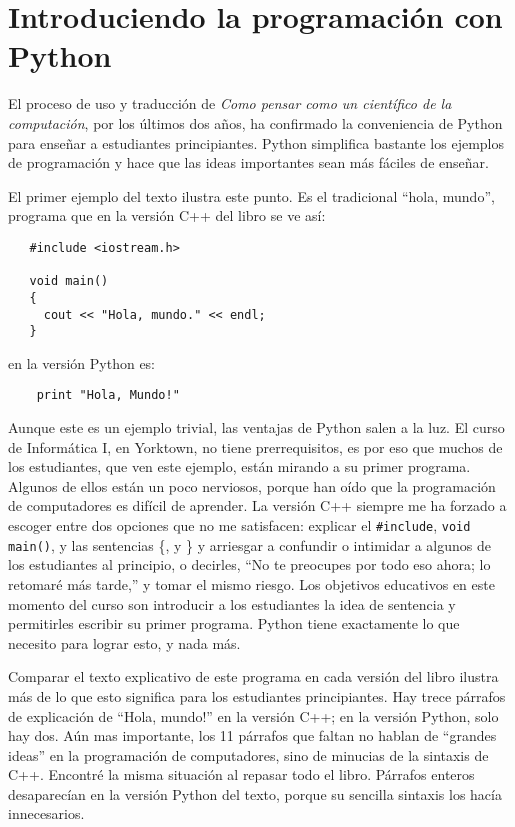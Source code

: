\section*{Introduciendo la programación con Python}

El proceso de uso y traducción de {\em Como pensar como un científico de la computación}, por los 
últimos dos años, ha confirmado la conveniencia de Python para enseñar
a estudiantes principiantes.  Python simplifica bastante los ejemplos de
programación y hace que las ideas importantes sean más fáciles de enseñar.

El primer ejemplo del texto ilustra este punto. Es el tradicional ``hola, mundo'', programa 
que en la versión C++ del libro se ve así:

\begin{verbatim}
   #include <iostream.h>

   void main()
   {
     cout << "Hola, mundo." << endl;
   }
\end{verbatim}

en la versión Python es:

\begin{verbatim}
    print "Hola, Mundo!"
\end{verbatim}

Aunque este es un ejemplo trivial, las ventajas de Python salen a la luz.  
El curso de Informática I, en Yorktown, no tiene prerrequisitos, es por eso que muchos de
los estudiantes, que ven este ejemplo, están mirando a su primer programa.  Algunos de 
ellos están un poco nerviosos, porque han oído que la programación de computadores es
difícil de aprender.  La versión C++ siempre me ha forzado a escoger entre dos
opciones que no me satisfacen:  explicar el \texttt{\#include}, \texttt{void main()}, y las
sentencias \{, y \} y arriesgar a confundir o intimidar a algunos de los estudiantes al principio, 
o decirles, ``No te preocupes por todo eso ahora;  lo retomaré
más tarde,'' y tomar el mismo riesgo.  Los objetivos educativos en este
momento del curso son  introducir a los estudiantes  la idea de  sentencia 
y  permitirles escribir su primer programa. Python tiene exactamente lo 
que necesito para lograr esto, y nada más.

Comparar el texto explicativo de este programa en cada versión del libro
ilustra más de lo que esto significa para los estudiantes principiantes.  Hay trece
párrafos de explicación de ``Hola, mundo!'' en la versión C++;  en la versión
Python, solo hay dos.  Aún mas importante,  los 11 párrafos que faltan no hablan
de ``grandes ideas'' en la programación de computadores, sino de minucias de la sintaxis de C++.  
Encontré la misma situación al repasar todo el libro.  Párrafos enteros
desaparecían en la versión Python del texto, porque su sencilla sintaxis los hacía innecesarios.

